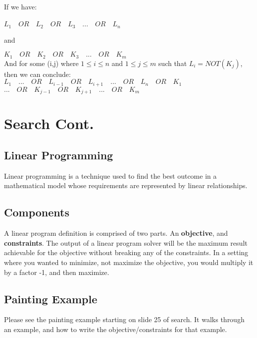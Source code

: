 \documentclass[letterpaper]{article} %
\begin{document}
If we have:\\\\

$L_1 \quad OR \quad L_2 \quad OR \quad L_3 \quad ... \quad OR \quad L_n$

and 

$K_1 \quad OR \quad K_2 \quad OR \quad K_3 \quad ... \quad OR \quad K_m$\\

And for some (i,j) where $1 \leq i \leq n$ and $1 \leq j \leq m$ such that $L_i = NOT(K_j)$, then we can conclude:\\

$L_1 \quad ... \quad OR \quad L_{i - 1} \quad OR \quad L_{i + 1} \quad ... \quad OR \quad L_n \quad OR \quad K_1 $\\
$... \quad OR \quad K_{j - 1} \quad OR \quad K_{j + 1} \quad ... \quad OR \quad K_m$

\section{Search Cont.}

\subsection{Linear Programming}

Linear programming is a technique used to find the best outcome in a mathematical model whose requirements are represented by linear relationships.

\subsection{Components}

A linear program definition is comprised of two parts. An \textbf{objective}, and \textbf{constraints}. The output of a linear program solver will be the maximum result achievable for the objective without breaking any of the constraints. In a setting where you wanted to minimize, not maximize the objective, you would multiply it by a factor -1, and then maximize.

\subsection{Painting Example}

Please see the painting example starting on slide 25 of search. It walks through an example, and how to write the objective/constraints for that example.
\end{document}
